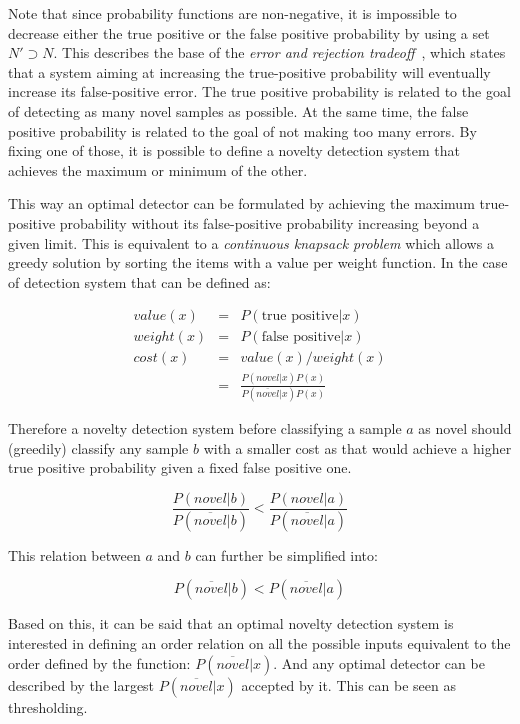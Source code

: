 Note that since probability functions are non-negative, it is impossible to decrease either the
true positive or the false positive probability by using a set $N' \supset N$.
This describes the base of the \emph{error and rejection tradeoff}~\cite{chow1970optimum}, which
states that a system aiming at increasing the true-positive probability will eventually increase its
false-positive error.
The true positive probability is related to the goal of detecting as many novel samples as possible.
At the same time, the false positive probability is related to the goal of not making too many errors.
By fixing one of those, it is possible to define a novelty detection system that achieves the maximum or minimum of the other.

This way an optimal detector can be formulated by achieving the maximum true-positive
probability without its false-positive probability increasing beyond a given limit.
This is equivalent to a \emph{continuous knapsack problem} which allows a greedy
solution by sorting the items with a value per weight function. In the case of 
detection system that can be defined as:

\begin{eqnarray}
value(x)  &=& P(\text{true positive}|x) \\
weight(x) &=& P(\text{false positive}|x) \\
cost(x)   &=& value(x)/weight(x) \\
          &=& \frac{P(novel|x)P(x)}{P(\overline{novel}|x)P(x)}
\end{eqnarray}

Therefore a novelty detection system before classifying a sample $a$ as novel should (greedily)
classify any sample $b$ with a smaller cost as that would achieve a higher true positive probability 
given a fixed false positive one.

\begin{equation}
\label{eq:knapsack}
\frac{P(novel|b)}{P(\overline{novel}|b)} < \frac{P(novel|a)}{P(\overline{novel}|a)}
\end{equation}

This relation between $a$ and $b$ can further be simplified into:

\begin{equation}
P(\overline{novel}|b) < P(\overline{novel}|a)
\end{equation}


Based on this, it can be said that an optimal novelty detection system is
interested in defining an order relation on all the possible inputs equivalent
to the order defined by the function: $P(\overline{novel}|x)$.
And any optimal detector can be described by the largest $P(\overline{novel}|x)$
accepted by it. This can be seen as thresholding.


